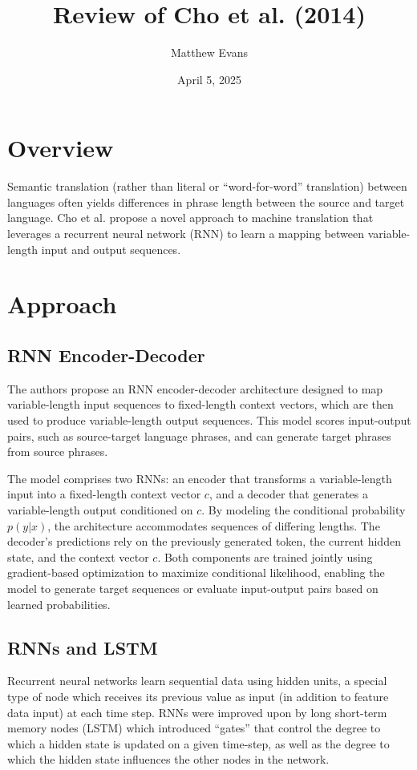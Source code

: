 \documentclass[10pt]{article}
\title{
    Review of Cho et al. (2014) \\
}
\author{Matthew Evans}
\date{April 5, 2025}
\begin{document}
\maketitle

\section*{Overview}
Semantic translation (rather than literal or ``word-for-word'' translation) between languages often yields differences in phrase length between the source and target language. Cho et al.\cite{cho2014learningphraserepresentationsusing} propose a novel approach to machine translation that leverages a recurrent neural network (RNN) to learn a mapping between variable-length input and output sequences.


\section*{Approach}
\subsection*{RNN Encoder-Decoder}
The authors propose an RNN encoder-decoder architecture designed to map variable-length input sequences to fixed-length context vectors, which are then used to produce variable-length output sequences. This model scores input-output pairs, such as source-target language phrases, and can generate target phrases from source phrases.

The model comprises two RNNs: an encoder that transforms a variable-length input into a fixed-length context vector \(c\), and a decoder that generates a variable-length output conditioned on \(c\). By modeling the conditional probability \(p(y|x)\), the architecture accommodates sequences of differing lengths. The decoder's predictions rely on the previously generated token, the current hidden state, and the context vector \(c\). Both components are trained jointly using gradient-based optimization to maximize conditional likelihood, enabling the model to generate target sequences or evaluate input-output pairs based on learned probabilities.

\subsection*{RNNs and LSTM}
Recurrent neural networks learn sequential data using hidden units, a special type of node which receives its previous value as input (in addition to feature data input) at each time step. RNNs were improved upon by long short-term memory nodes (LSTM)\cite{6795963} which introduced ``gates'' that control the degree to which a hidden state is updated on a given time-step, as well as the degree to which the hidden state influences the other nodes in the network.
\end{document}
